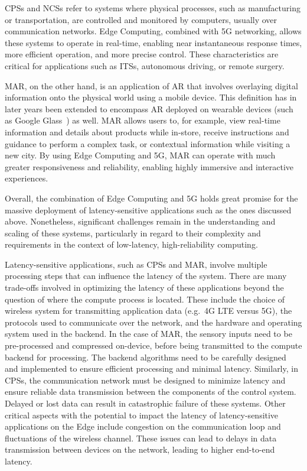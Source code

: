 \acfp{CPS} and \acfp{NCS} refer to systems where physical processes, such as manufacturing or transportation, are controlled  and monitored by computers, usually over communication networks.
Edge Computing, combined with 5G networking, allows these systems to operate in real-time, enabling near instantaneous response times, more efficient operation, and more precise control.
These characteristics are critical for applications such as \glspl{ITS}, autonomous driving, or remote surgery.

\gls{MAR}, on the other hand, is an application of \gls{AR} that involves overlaying digital information onto the physical world using a mobile device.
This definition has in later years been extended to encompass \gls{AR} deployed on wearable devices (such as Google Glass~\cite{googleglass}) as well.
\gls{MAR} allows users to, for example, view real-time information and details about products while in-store, receive instructions and guidance to perform a complex task, or contextual information while visiting a new city.
By using Edge Computing and 5G, \gls{MAR} can operate with much greater responsiveness and reliability, enabling highly immersive and interactive experiences.

Overall, the combination of Edge Computing and 5G holds great promise for the massive deployment of latency-sensitive applications such as the ones discussed above.
Nonetheless, significant challenges remain in the understanding and scaling of these systems, particularly in regard to their complexity and requirements in the context of low-latency, high-reliability computing.

Latency-sensitive applications, such as \glspl{CPS} and \gls{MAR}, involve multiple processing steps that can influence the latency of the system.
There are many trade-offs involved in optimizing the latency of these applications beyond the question of where the compute process is located. 
These include the choice of wireless system for transmitting application data (e.g.\ 4G \gls{LTE} versus 5G), the protocols used to communicate over the network, and the hardware and operating system used in the backend.
In the case of \gls{MAR}, the sensory inputs need to be pre-processed and compressed on-device, before being transmitted to the compute backend for processing.
The backend algorithms need to be carefully designed and implemented to ensure efficient processing and minimal latency. 
Similarly, in \glspl{CPS}, the communication network must be designed to minimize latency and ensure reliable data transmission between the components of the control system.
Delayed or lost data can result in catastrophic failure of these systems.
Other critical aspects with the potential to impact the latency of latency-sensitive applications on the Edge include congestion on the communication loop and fluctuations of the wireless channel.
These issues can lead to delays in data transmission between devices on the network, leading to higher end-to-end latency.

